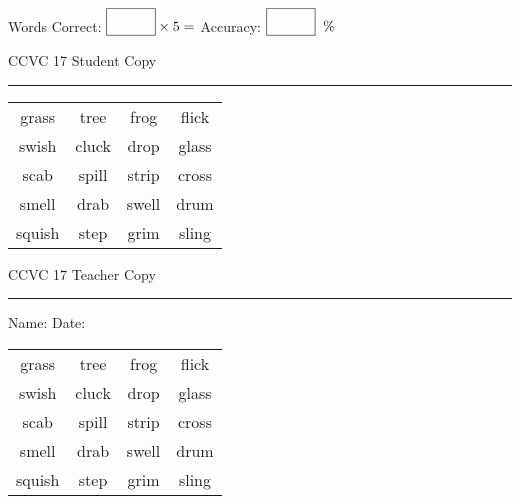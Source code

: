\documentclass{memoir}
\begin{document}
\normalsize

Words Correct: $\fbox{\phantom{\huge 100}} \times 5 = $ Accuracy: $\fbox{\phantom{\huge 100}}\;\; \%$ 

\vfill

\newpage


\footnotesize \noindent
CCVC 17 \hfill Student Copy
\smallskip
\hrule

\Large

\setlength{\tabcolsep}{14pt}
\def\arraystretch{3}

{\selectfont


\begin{vplace}[0.5]
\begin{center}
\begin{tabular}{cccc}
grass                    & tree & frog & flick            \\
swish & cluck & drop & glass \\
scab & spill & strip & cross \\
smell & drab             & swell & drum \\
squish & step & grim       & sling \\
\end{tabular}
\end{center}
\end{vplace}

}

\newpage

\footnotesize \noindent
CCVC 17 \hfill Teacher Copy
\smallskip
\hrule

\normalsize

\vfill

\noindent
Name: \underline{\hspace{1.75in}} \hfill Date: \underline{\hspace{1in}}

\Large

{\selectfont


\begin{vplace}[0.5]
\begin{center}
\begin{tabular}{cccc}
grass                    & tree & frog & flick            \\
swish & cluck & drop & glass \\
scab & spill & strip & cross \\
smell & drab             & swell & drum \\
squish & step & grim       & sling \\
\end{tabular}
\end{center}
\end{vplace}



}
\end{document}

